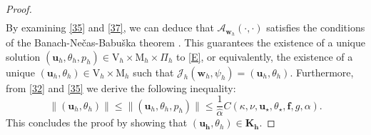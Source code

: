 \documentclass[10pt,a4paper]{article}
\begin{document}
\begin{proof}
\begin{align}
  			\end{align}
  			By examining \eqref{35} and \eqref{37}, we can deduce that $\mathcal{A}_{\boldsymbol{w}_h}\left( \cdot , \cdot\right)$ satisfies the conditions of the Banach-Ne\v{c}as-Babu\v{s}ka theorem \cite[Theorem 2.6]{MR2050138}. This guarantees the existence of a unique solution $(\boldsymbol{u}_h,\theta_h, p_h) \in \mathrm{V}_h \times \mathrm{M}_h \times  \Pi_h$ to \eqref{E}, or equivalently, the existence of a unique $(\boldsymbol{u}_h , \theta_h) \in \mathrm{V}_h \times \mathrm{M}_h$ such that $\mathcal{J}_h(\boldsymbol{w}_h, \psi_h)=(\boldsymbol{u}_h, \theta_h)$. Furthermore, from \eqref{32} and \eqref{35} we derive the following inequality:
  			$$
  			\|(\boldsymbol{u}_h, \theta_h)\| \leq \|(\boldsymbol{u}_h, \theta_h, p_h)\| \leq \frac{1}{\hat{\alpha}} C(\kappa, \nu, \boldsymbol{u}_{\star}, \theta_{\star}, \boldsymbol{f}, g, \alpha).
  			$$
  		This concludes the proof by showing that $(\boldsymbol{u_h}, \theta_h) \in \boldsymbol{K_h}$.	
  		\end{proof} 
\end{document}
